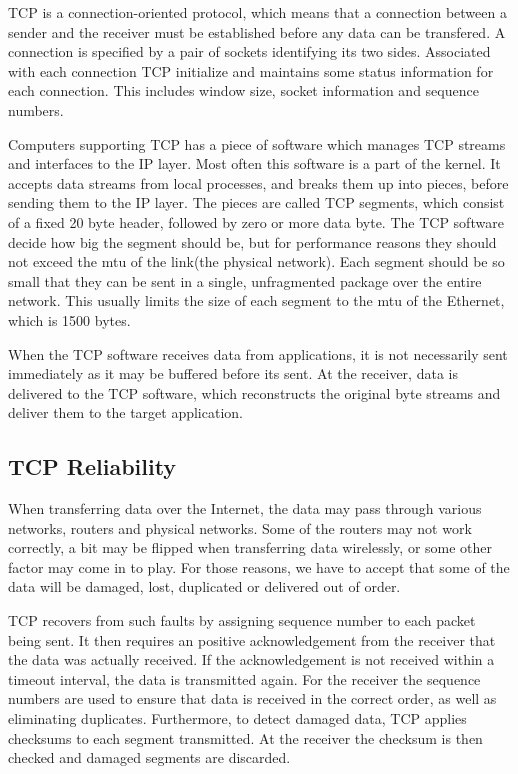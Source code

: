  TCP is a connection-oriented protocol, which means that a connection between a
 sender and the receiver must be established before any data can be transfered.
 A connection is specified by a pair of sockets identifying its two sides.
 Associated with each connection TCP initialize and maintains some status
 information for each connection. This includes window size, socket information
 and sequence numbers.

Computers supporting TCP has a piece of software which manages TCP streams and
interfaces to the IP layer. Most often this software is a part of the
kernel\cite{computer-networks}. It accepts data streams from local processes,
and breaks them up into pieces, before sending them to the IP layer. The pieces
are called TCP segments, which consist of a fixed 20 byte header, followed by
zero or more data byte. The TCP software decide how big the segment should be,
but for performance reasons they should not exceed the \gls{mtu} of the link(the
physical network). Each segment should be so small that they can be sent in a
single, unfragmented package over the entire network. This usually limits the
size of each segment to the \gls{mtu} of the Ethernet, which is 1500 bytes.

When the TCP software receives data from applications, it is not necessarily
sent immediately as it may be buffered before its sent. At the receiver, data is
delivered to the TCP software, which reconstructs the original byte streams and
deliver them to the target application.


\subsection{TCP Reliability}

When transferring data over the Internet, the data may pass through various
networks, routers and physical networks. Some of the routers may not work
correctly, a bit may be flipped when transferring data wirelessly, or some other
factor may come in to play. For those reasons, we have to accept that some of
the data will be damaged, lost, duplicated or delivered out of order.

TCP recovers from such faults by assigning sequence number to each packet being
sent. It then requires an positive acknowledgement from the receiver that the
data was actually received. If the acknowledgement is not received within a
timeout interval, the data is transmitted again. For the receiver the sequence
numbers are used to ensure that data is received in the correct order, as well
as eliminating duplicates. Furthermore, to detect damaged data, TCP applies
checksums to each segment transmitted. At the receiver the checksum is then
checked and damaged segments are discarded.

